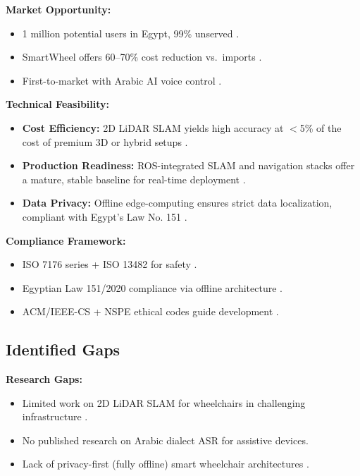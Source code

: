 \documentclass[12pt,a4paper]{report}
\begin{document}
\textbf{Market Opportunity:}
\begin{itemize}
    \item 1 million potential users in Egypt, 99\% unserved \cite{idsc_egypt,alhassan_foundation}.
    \item SmartWheel offers 60--70\% cost reduction vs.\ imports \cite{grandview_market}.
    \item First-to-market with Arabic AI voice control .
\end{itemize}

\textbf{Technical Feasibility:}
\begin{itemize}
    \item \textbf{Cost Efficiency:} 2D LiDAR SLAM yields high accuracy at $<$5\% of the cost of premium 3D or hybrid setups \cite{tu2025design}.
    \item \textbf{Production Readiness:} ROS-integrated SLAM and navigation stacks offer a mature, stable baseline for real-time deployment \cite{ros2, tu2025design}.
    \item \textbf{Data Privacy:} Offline edge-computing ensures strict data localization, compliant with Egypt's Law No. 151 \cite{egypt_law_151}.
\end{itemize}

\textbf{Compliance Framework:}
\begin{itemize}
    \item ISO 7176 series + ISO 13482 for safety \cite{iso7176_4,iso7176_6,iso13482}.
    \item Egyptian Law 151/2020 compliance via offline architecture \cite{egypt_law_151}.
    \item ACM/IEEE-CS + NSPE ethical codes guide development \cite{acm_ieee_code,nspe_code}.
\end{itemize}

\subsection{Identified Gaps}

\textbf{Research Gaps:}
\begin{itemize}
    \item Limited work on 2D LiDAR SLAM for wheelchairs in challenging infrastructure \cite{elalfy_monocular}.
    \item No published research on Arabic dialect ASR for assistive devices.
    \item Lack of privacy-first (fully offline) smart wheelchair architectures \cite{egypt_law_151}.
\end{itemize}
\end{document}
